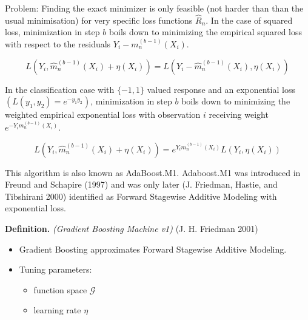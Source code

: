 \documentclass[
]{book}
\providecommand{\tightlist}{%
  \setlength{\itemsep}{0pt}\setlength{\parskip}{0pt}}
\begin{document}
Problem: Finding the exact minimizer is only feasible (not harder than than the usual minimisation) for very specific loss functions \(\hat R_n\). In the case of squared loss, minimization in step \(b\) boils down to minimizing the empirical squared loss with respect to the residuals \(Y_i- m_n^{(b-1)}(X_i)\).

\[
L\left(Y_i, \hat m_n^{(b-1)}(X_i)+\eta(X_i)\right)=L\left(Y_i-\hat m_n^{(b-1)}(X_i),\eta(X_i)\right)
\]

In the classification case with \(\{-1,1\}\) valued response and an exponential loss \((L(y_1,y_2)=e^{-y_1y_2})\), minimization in step \(b\) boils down to minimizing the weighted empirical exponential loss with observation \(i\) receiving weight \(e^{-Y_im_n^{(b-1)}(X_i)}\).

\[
L\left(Y_i,  \hat m_n^{(b-1)}(X_i)+\eta(X_i)\right)=e^{Y_im_n^{(b-1)}(X_i)}L\left(Y_i,\eta(X_i)\right)
\]

This algorithm is also known as AdaBoost.M1. Adaboost.M1 was introduced in Freund and Schapire (1997) and was only later (J. Friedman, Hastie, and Tibshirani 2000) identified as Forward Stagewise Additive Modeling with exponential loss.

\textbf{Definition.} \emph{(Gradient Boosting Machine v1)} (J. H. Friedman 2001)

\begin{itemize}
\tightlist
\item
  Gradient Boosting approximates Forward Stagewise Additive Modeling.
\item
  Tuning parameters:

  \begin{itemize}
  \tightlist
  \item
    function space \(\mathcal G\)
  \item
    learning rate \(\eta\)
  \end{itemize}
\end{itemize}
\end{document}
